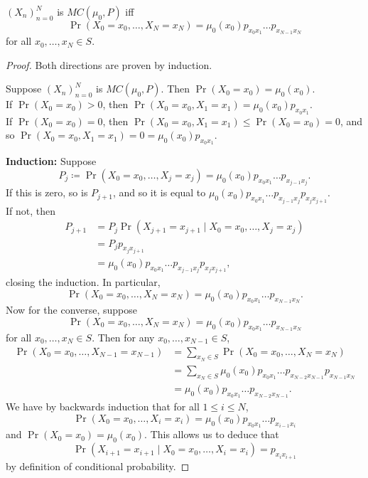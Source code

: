 \begin{theorem}
    $(X_n)_{n=0}^N$ is $MC(\mu_0, P)$ iff \[
        \Pr(X_0 = x_0, \dots, X_N = x_N)
            = \mu_0(x_0) p_{x_0 x_1} \dots p_{x_{N-1} x_N}
    \] for all $x_0, \dots, x_N \in S$.
\end{theorem}
\begin{proof}
    Both directions are proven by induction.

    Suppose $(X_n)_{n=0}^N$ is $MC(\mu_0, P)$.
    Then $\Pr(X_0 = x_0) = \mu_0(x_0)$. \\
    If $\Pr(X_0 = x_0) > 0$, then
    $\Pr(X_0 = x_0, X_1 = x_1) = \mu_0(x_0) p_{x_0 x_1}$. \\
    If $\Pr(X_0 = x_0) = 0$, then
    $\Pr(X_0 = x_0, X_1 = x_1) \le \Pr(X_0 = x_0) = 0$,
    and so $\Pr(X_0 = x_0, X_1 = x_1) = 0 = \mu_0(x_0) p_{x_0 x_1}$.

    \textbf{Induction:} Suppose \[
        P_j \coloneq \Pr(X_0 = x_0, \dots, X_j = x_j)
        = \mu_0(x_0) p_{x_0 x_1} \dots p_{x_{j-1} x_j}.
    \] If this is zero, so is $P_{j+1}$, and so it is equal to
    $\mu_0(x_0) p_{x_0 x_1} \dots p_{x_{j-1} x_j} p_{x_j x_{j+1}}$. \\
    If not, then \begin{align*}
        P_{j+1}
            &= P_j\Pr(X_{j+1} = x_{j+1} \mid X_0 = x_0, \dots, X_j = x_j) \\
            &= P_j p_{x_j x_{j+1}} \\
            &= \mu_0(x_0) p_{x_0 x_1} \dots p_{x_{j-1} x_j} p_{x_j x_{j+1}},
    \end{align*} closing the induction.
    In particular, \[
        \Pr(X_0 = x_0, \dots, X_N = x_N) = \mu_0(x_0) p_{x_0 x_1} \dots
        p_{x_{N-1} x_N}.
    \] Now for the converse, suppose \[
        \Pr(X_0 = x_0, \dots, X_N = x_N)
        = \mu_0(x_0) p_{x_0 x_1} \dots p_{x_{N-1} x_N}
    \] for all $x_0, \dots, x_N \in S$.
    Then for any $x_0, \dots, x_{N-1} \in S$,
    \begin{align*}
        \Pr(X_0 = x_0, \dots, X_{N-1} = x_{N-1})
            &= \sum_{x_N \in S} \Pr(X_0 = x_0, \dots, X_N = x_N) \\
            &= \sum_{x_N \in S} \mu_0(x_0) p_{x_0 x_1} \dots 
                p_{x_{N-2} x_{N-1}} p_{x_{N-1} x_N} \\
            &= \mu_0(x_0) p_{x_0 x_1} \dots p_{x_{N-2} x_{N-1}}.
    \end{align*}
    We have by backwards induction that for all $1 \le i \le N$, \[
        \Pr(X_0 = x_0, \dots, X_i = x_i)
        = \mu_0(x_0) p_{x_0 x_1} \dots p_{x_{i-1} x_i}
    \] and $\Pr(X_0 = x_0) = \mu_0(x_0)$.
    This allows us to deduce that \[
        \Pr(X_{i+1} = x_{i+1} \mid X_0 = x_0, \dots, X_i = x_i)
        = p_{x_i x_{i+1}}
    \] by definition of conditional probability.
\end{proof}

